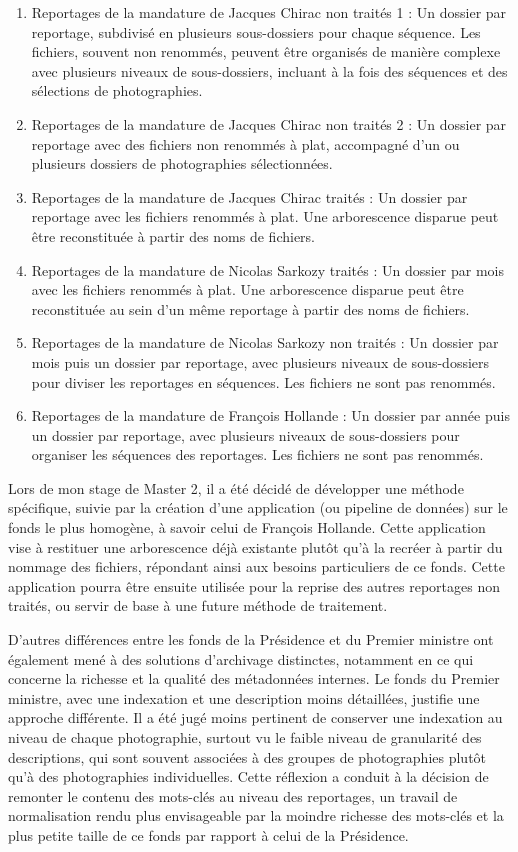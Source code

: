 \begin{enumerate}
\item Reportages de la mandature de Jacques Chirac non traités 1 : Un dossier par reportage, subdivisé en plusieurs sous-dossiers pour chaque séquence. Les fichiers, souvent non renommés, peuvent être organisés de manière complexe avec plusieurs niveaux de sous-dossiers, incluant à la fois des séquences et des sélections de photographies.
\item Reportages de la mandature de Jacques Chirac non traités 2 : Un dossier par reportage avec des fichiers non renommés à plat, accompagné d’un ou plusieurs dossiers de photographies sélectionnées.
\item Reportages de la mandature de Jacques Chirac traités : Un dossier par reportage avec les fichiers renommés à plat. Une arborescence disparue peut être reconstituée à partir des noms de fichiers.
\item Reportages de la mandature de Nicolas Sarkozy traités : Un dossier par mois avec les fichiers renommés à plat. Une arborescence disparue peut être reconstituée au sein d’un même reportage à partir des noms de fichiers.
\item Reportages de la mandature de Nicolas Sarkozy non traités : Un dossier par mois puis un dossier par reportage, avec plusieurs niveaux de sous-dossiers pour diviser les reportages en séquences. Les fichiers ne sont pas renommés.
\item Reportages de la mandature de François Hollande : Un dossier par année puis un dossier par reportage, avec plusieurs niveaux de sous-dossiers pour organiser les séquences des reportages. Les fichiers ne sont pas renommés.
\end{enumerate}

Lors de mon stage de Master 2, il a été décidé de développer une méthode spécifique, suivie par la création d’une application (ou pipeline de données) sur le fonds le plus homogène, à savoir celui de François Hollande. Cette application vise à restituer une arborescence déjà existante plutôt qu’à la recréer à partir du nommage des fichiers, répondant ainsi aux besoins particuliers de ce fonds. Cette application pourra être ensuite utilisée pour la reprise des autres reportages non traités, ou servir de base à une future méthode de traitement.

D’autres différences entre les fonds de la Présidence et du Premier ministre ont également mené à des solutions d’archivage distinctes, notamment en ce qui concerne la richesse et la qualité des métadonnées internes. Le fonds du Premier ministre, avec une indexation et une description moins détaillées, justifie une approche différente. Il a été jugé moins pertinent de conserver une indexation au niveau de chaque photographie, surtout vu le faible niveau de granularité des descriptions, qui sont souvent associées à des groupes de photographies plutôt qu’à des photographies individuelles. Cette réflexion a conduit à la décision de remonter le contenu des mots-clés au niveau des reportages, un travail de normalisation rendu plus envisageable par la moindre richesse des mots-clés et la plus petite taille de ce fonds par rapport à celui de la Présidence.
\\

